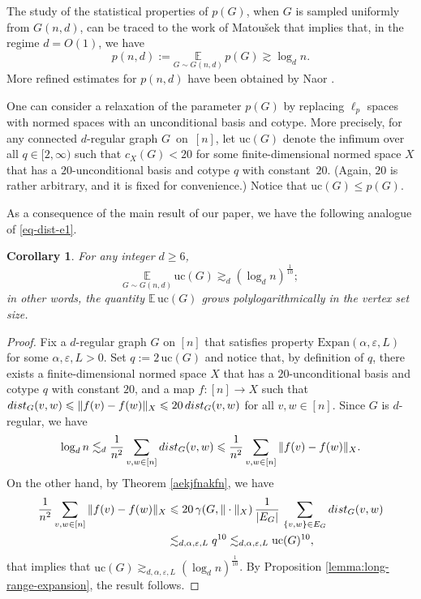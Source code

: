 \documentclass[11pt,leqno]{amsart}
\newtheorem{corollary}[theorem]{Corollary}
\theoremstyle{remark}
\theoremstyle{plain}
\def\dist{{\rm dist}}
\def\dist{{\rm dist}}
\begin{document}
The study of the statistical properties of $p(G)$, when $G$ is sampled uniformly from $G(n,d)$,
can be traced to the work of Matou\v{s}ek \cite{Ma97} that implies that, in the regime $d=O(1)$, we have
\begin{equation} \label{eq-dist-e1}
p(n,d):= \underset{G\sim G(n,d)}{\mathbb{E}}\, p(G) \gtrsim \log_d n.
\end{equation}
More refined estimates for $p(n,d)$ have been obtained by Naor \cite[Proposition 1.9]{Na14}.

One can consider a relaxation of the parameter $p(G)$ by replacing $\ell_p$ spaces with
normed spaces with an unconditional basis and cotype. More precisely, for any connected $d$-regular graph $G$~on~$[n]$,
let $\mathrm{uc}(G)$ denote the infimum over all $q\in [2,\infty)$ such that $c_X(G)<20$ for some
finite-dimensional normed space $X$ that has a $20$-unconditional basis and cotype $q$ with constant~$20$.
(Again, $20$ is rather arbitrary, and it is fixed for convenience.)
Notice that $\mathrm{uc}(G)\leqslant p(G)$.

As a consequence of the
main result of our paper, we have the following analogue of \eqref{eq-dist-e1}.
\begin{corollary}
For any integer $d\geqslant 6$,
\[ \underset{G\sim G(n,d)}{\mathbb{E}}\, \mathrm{uc}(G) \gtrsim_d (\log_d n)^{\frac{1}{10}}; \]
in other words, the quantity $\mathbb{E}\, \mathrm{uc}(G)$ grows polylogarithmically in the vertex set size.
\end{corollary}
\begin{proof}
Fix a $d$-regular graph $G$ on $[n]$ that satisfies property $\mathrm{Expan}(\alpha,\varepsilon,L)$ for some
$\alpha,\varepsilon,L>0$. Set $q:=2\,\mathrm{uc}(G)$ and notice that, by definition of $q$, there exists a finite-dimensional
normed space $X$ that has a $20\text{-unconditional}$ basis and cotype $q$ with constant $20$, and a map $f\colon [n]\to X$
such that $\dist_G(v,w)\leqslant \|f(v)-f(w)\|_X\leqslant 20\, \dist_G(v,w)$ for all $v,w\in [n]$. Since $G$ is $d$-regular, we have
\[ \log_d n \lesssim_d \frac{1}{n^2} \sum_{v,w\in [n]} \dist_G(v,w) \leqslant \frac{1}{n^2} \sum_{v,w\in [n]} \|f(v)-f(w)\|_X. \]
On the other hand, by Theorem \ref{aekjfnakfn}, we have
\begin{align*}
\frac{1}{n^2} \sum_{v,w\in [n]} \|f(v)-f(w)\|_X & \leqslant
20\,\gamma(G,\|\cdot\|_X) \, \frac{1}{|E_G|}\, \sum_{\{v,w\}\in E_G} \dist_G(v,w) \\
& \lesssim_{d,\alpha,\varepsilon,L} q^{10}
\lesssim_{d,\alpha,\varepsilon,L} \mathrm{uc}(G)^{10},
\end{align*}
that implies that $\mathrm{uc}(G)\gtrsim_{d,\alpha,\varepsilon,L} (\log_d n)^{\frac{1}{10}}$.
By Proposition \ref{lemma:long-range-expansion}, the result follows.
\end{proof}
\end{document}
